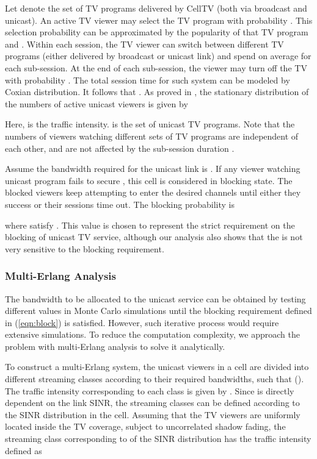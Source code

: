 \documentclass[journal]{IEEEtran}
\begin{document}
Let  denote the set of TV programs delivered by CellTV (both via broadcast and unicast). An active TV viewer may select the  TV program with probability . This selection probability can be approximated by the popularity of that TV program and . Within each session, the TV viewer can switch between different TV programs (either delivered by broadcast or unicast link) and spend  on average for each sub-session. At the end of each sub-session, the viewer may turn off the TV with probability . The total session time for such system can be modeled by Coxian distribution. It follows that . As proved in \cite{Caterin}, the stationary distribution of the numbers of active unicast viewers is given by

Here,  is the traffic intensity.  is the set of unicast TV programs. Note that the numbers of viewers watching different sets of TV programs are independent of each other, and are not affected by the sub-session duration \cite{Caterin}.

Assume the bandwidth required for the  unicast link is . If any viewer watching unicast program fails to secure , this cell is considered in blocking state. The blocked viewers keep attempting to enter the desired channels until either they success or their sessions time out. The blocking probability is

where  satisfy . This value is chosen to represent the strict requirement on the blocking of unicast TV service, although our analysis also shows that the  is not very sensitive to the blocking requirement.




\subsubsection{\textbf{Multi-Erlang Analysis}}
The bandwidth to be allocated to the unicast service can be obtained by testing different values in Monte Carlo simulations until the blocking requirement defined in (\ref{eqn:block}) is satisfied. However, such iterative process would require extensive simulations. To reduce the computation complexity, we approach the problem with multi-Erlang analysis to solve it analytically.

To construct a multi-Erlang system, the unicast viewers in a cell are divided into  different streaming classes according to their required bandwidths, such that  (). The traffic intensity corresponding to each class is given by . Since  is directly dependent on the link SINR, the streaming classes can be defined according to the SINR distribution in the cell. Assuming that the TV viewers are uniformly located inside the TV coverage, subject to uncorrelated shadow fading, the streaming class corresponding to  of the SINR distribution has the traffic intensity defined as
\end{document}
